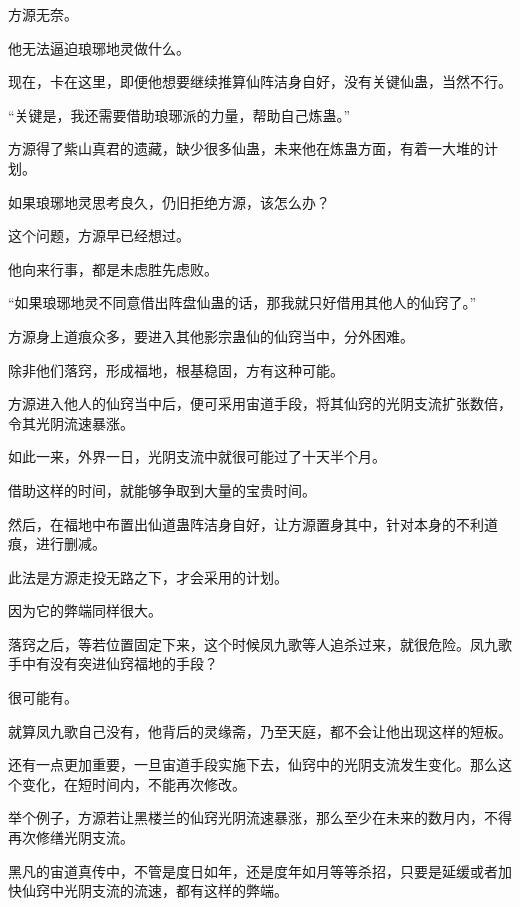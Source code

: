 
\begin{this_body}



方源无奈。

他无法逼迫琅琊地灵做什么。

现在，卡在这里，即便他想要继续推算仙阵洁身自好，没有关键仙蛊，当然不行。

“关键是，我还需要借助琅琊派的力量，帮助自己炼蛊。”

方源得了紫山真君的遗藏，缺少很多仙蛊，未来他在炼蛊方面，有着一大堆的计划。

如果琅琊地灵思考良久，仍旧拒绝方源，该怎么办？

这个问题，方源早已经想过。

他向来行事，都是未虑胜先虑败。

“如果琅琊地灵不同意借出阵盘仙蛊的话，那我就只好借用其他人的仙窍了。”

方源身上道痕众多，要进入其他影宗蛊仙的仙窍当中，分外困难。

除非他们落窍，形成福地，根基稳固，方有这种可能。

方源进入他人的仙窍当中后，便可采用宙道手段，将其仙窍的光阴支流扩张数倍，令其光阴流速暴涨。

如此一来，外界一日，光阴支流中就很可能过了十天半个月。

借助这样的时间，就能够争取到大量的宝贵时间。

然后，在福地中布置出仙道蛊阵洁身自好，让方源置身其中，针对本身的不利道痕，进行删减。

此法是方源走投无路之下，才会采用的计划。

因为它的弊端同样很大。

落窍之后，等若位置固定下来，这个时候凤九歌等人追杀过来，就很危险。凤九歌手中有没有突进仙窍福地的手段？

很可能有。

就算凤九歌自己没有，他背后的灵缘斋，乃至天庭，都不会让他出现这样的短板。

还有一点更加重要，一旦宙道手段实施下去，仙窍中的光阴支流发生变化。那么这个变化，在短时间内，不能再次修改。

举个例子，方源若让黑楼兰的仙窍光阴流速暴涨，那么至少在未来的数月内，不得再次修缮光阴支流。

黑凡的宙道真传中，不管是度日如年，还是度年如月等等杀招，只要是延缓或者加快仙窍中光阴支流的流速，都有这样的弊端。


\end{this_body}
